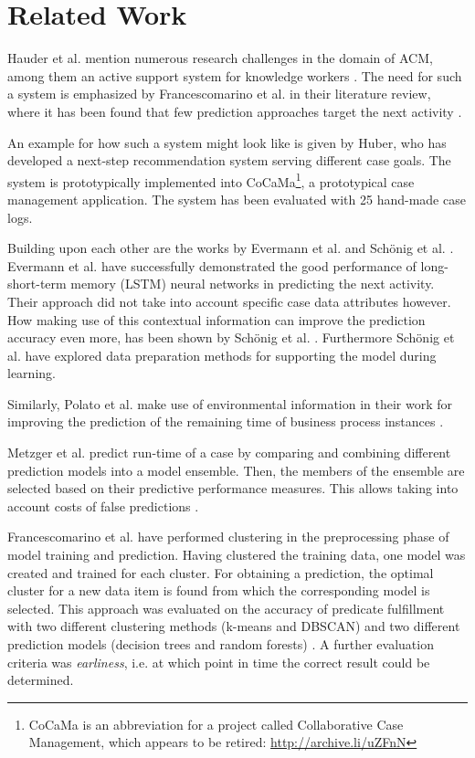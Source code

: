 \chapter{Related Work}\label{chap:related-work}



Hauder et al. mention numerous research challenges in the domain of ACM, among them an active support system for knowledge workers \cite{hauder2014}.
The need for such a system is emphasized by Francescomarino et al. in their literature review, where it has been found that few prediction approaches target the next activity \cite{francescomarino2018}.

An example for how such a system might look like is given by Huber, who has developed a next-step recommendation system serving different case goals.
The system is prototypically implemented into CoCaMa\footnote{CoCaMa is an abbreviation for a project called Collaborative Case Management, which appears to be retired: \url{http://archive.li/uZFnN}}, a prototypical case management application. The system has been evaluated with 25 hand-made case logs.

Building upon each other are the works by Evermann et al. \cite{evermann2016} and Schönig et al. \cite{schoenig2018}.
Evermann et al. have successfully demonstrated the good performance of long-short-term memory (LSTM) neural networks in predicting the next activity.
Their approach did not take into account specific case data attributes however.
How making use of this contextual information can improve the prediction accuracy even more, has been shown by Schönig et al. \cite{schoenig2018}.
Furthermore Schönig et al. have explored data preparation methods for supporting the model during learning.

Similarly, Polato et al. make use of environmental information in their work for improving the prediction of the remaining time of business process instances \cite{polato2014}.

Metzger et al. predict run-time of a case by comparing and combining different prediction models into a model ensemble.
Then, the members of the ensemble are selected based on their predictive performance measures.
This allows taking into account costs of false predictions \cite{metzger2015}.

Francescomarino et al. have performed clustering in the preprocessing phase of model training and prediction.
Having clustered the training data, one model was created and trained for each cluster.
For obtaining a prediction, the optimal cluster for a new data item is found from which the corresponding model is selected.
This approach was evaluated on the accuracy of predicate fulfillment with two different clustering methods (k-means and DBSCAN) and two different prediction models (decision trees and random forests) \cite{francescomarino2015}.
A further evaluation criteria was \textit{earliness}, i.e. at which point in time the correct result could be determined.

